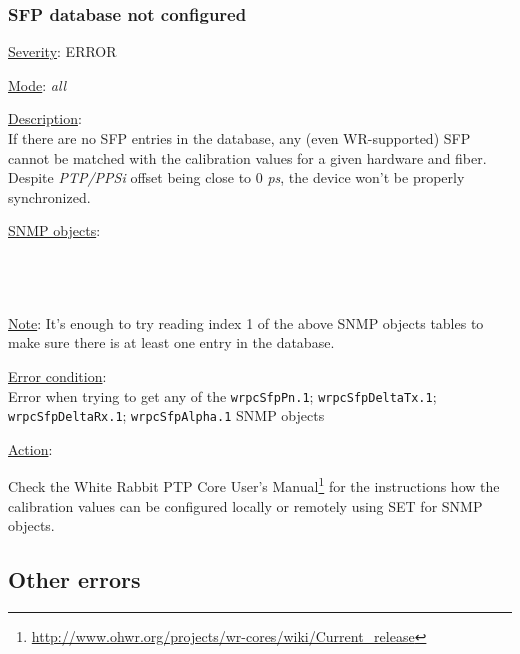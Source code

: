 \subsubsection{\bf SFP database not configured}
		\label{fail:timing:no_sfpdb}
		\begin{pck_descr}
			\item [] \underline{Severity}: ERROR
			\item [] \underline{Mode}: \emph{all}
			\item [] \underline{Description}:\\
				If there are no SFP entries in the database, any (even WR-supported) SFP
				cannot be matched with the calibration values for a given hardware and
				fiber. Despite \emph{PTP/PPSi} offset being close to 0 \emph{ps}, the
				device won't be properly synchronized.
			\item [] \underline{SNMP objects}:\\
				{\footnotesize
				\\
				\\
				\\
				 }
			\item [] \underline{Note}: It's enough to try reading index 1 of the above
				SNMP objects tables to make sure there is at least one entry in the
				database.
			\item [] \underline{Error condition}:\\
				{\footnotesize
        Error when trying to get any of the \texttt{wrpcSfpPn.1};
        \texttt{wrpcSfpDeltaTx.1}; \texttt{wrpcSfpDeltaRx.1};
        \texttt{wrpcSfpAlpha.1} SNMP objects}
      \item [] \underline{Action}:
        \begin{pck_proc}
        \item Check the White Rabbit PTP Core User's
          Manual\footnote{\url{http://www.ohwr.org/projects/wr-cores/wiki/Current\_release}}
          for the instructions how the calibration values can be configured
          locally or remotely using SET for SNMP objects.
        \end{pck_proc}
		\end{pck_descr}

\newpage
\subsection{Other errors}
\label{sec:other_fail}

